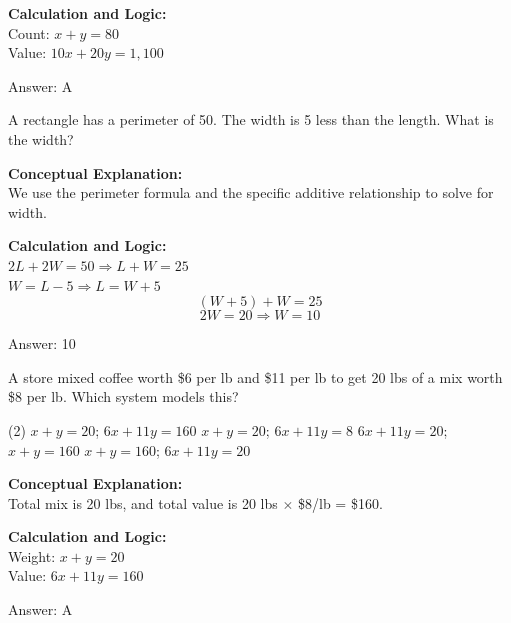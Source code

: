 \documentclass[11pt,paper=a4,answers]{exam}
\begin{document}
\begin{questions}
\begin{solution}
\vspace{10pt}
\textbf{Calculation and Logic:} \\
Count: $x + y = 80$ \\
Value: $10x + 20y = 1,100$

\vspace{15pt}
Answer: \colorbox{yellow!100}{A}
\end{solution}

\question
A rectangle has a perimeter of 50. The width is 5 less than the length. What is the width?

\begin{solution}
\textbf{Conceptual Explanation:} \\
We use the perimeter formula and the specific additive relationship to solve for width.

\vspace{10pt}
\textbf{Calculation and Logic:} \\
$2L + 2W = 50 \Rightarrow L + W = 25$ \\
$W = L - 5 \Rightarrow L = W + 5$ \\
\[(W + 5) + W = 25\]
\[2W = 20 \Rightarrow W = 10\]

\vspace{15pt}
Answer: \colorbox{yellow!100}{10}
\end{solution}

\question
A store mixed coffee worth \$6 per lb and \$11 per lb to get 20 lbs of a mix worth \$8 per lb. Which system models this?
\begin{tasks}(2)
    \task $x + y = 20$; $6x + 11y = 160$
    \task $x + y = 20$; $6x + 11y = 8$
    \task $6x + 11y = 20$; $x + y = 160$
    \task $x + y = 160$; $6x + 11y = 20$
\end{tasks}

\begin{solution}
\textbf{Conceptual Explanation:} \\
Total mix is 20 lbs, and total value is 20 lbs $\times$ \$8/lb = \$160.

\vspace{10pt}
\textbf{Calculation and Logic:} \\
Weight: $x + y = 20$ \\
Value: $6x + 11y = 160$

\vspace{15pt}
Answer: \colorbox{yellow!100}{A}
\end{solution}


\end{questions}
\end{document}
